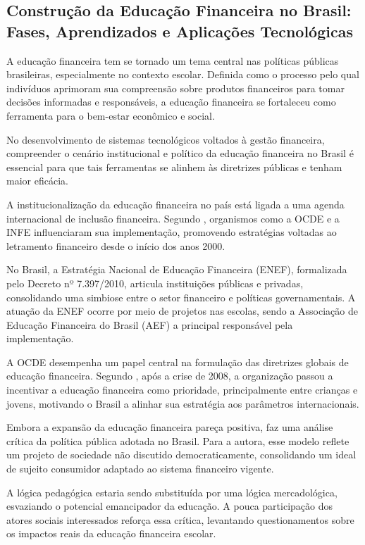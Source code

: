 \documentclass[
	article,			%
	12pt,				%
	oneside,			%
	a4paper,			%
	english,			%
	brazil,				%
	sumario=tradicional
	]{abntex2}
\begin{document}
\subsection{Construção da Educação Financeira no Brasil: Fases, Aprendizados e Aplicações Tecnológicas}
    A educação financeira tem se tornado um tema central nas políticas públicas brasileiras, especialmente no contexto escolar. Definida como o processo pelo qual indivíduos aprimoram sua compreensão sobre produtos financeiros para tomar decisões informadas e responsáveis, a educação financeira se fortaleceu como ferramenta para o bem-estar econômico e social.

    No desenvolvimento de sistemas tecnológicos voltados à gestão financeira, compreender o cenário institucional e político da educação financeira no Brasil é essencial para que tais ferramentas se alinhem às diretrizes públicas e tenham maior eficácia.

    A institucionalização da educação financeira no país está ligada a uma agenda internacional de inclusão financeira. Segundo , organismos como a OCDE e a INFE influenciaram sua implementação, promovendo estratégias voltadas ao letramento financeiro desde o início dos anos 2000.

    No Brasil, a Estratégia Nacional de Educação Financeira (ENEF), formalizada pelo Decreto nº 7.397/2010, articula instituições públicas e privadas, consolidando uma simbiose entre o setor financeiro e políticas governamentais. A atuação da ENEF ocorre por meio de projetos nas escolas, sendo a Associação de Educação Financeira do Brasil (AEF) a principal responsável pela implementação.

    A OCDE desempenha um papel central na formulação das diretrizes globais de educação financeira. Segundo , após a crise de 2008, a organização passou a incentivar a educação financeira como prioridade, principalmente entre crianças e jovens, motivando o Brasil a alinhar sua estratégia aos parâmetros internacionais.

    Embora a expansão da educação financeira pareça positiva,  faz uma análise crítica da política pública adotada no Brasil. Para a autora, esse modelo reflete um projeto de sociedade não discutido democraticamente, consolidando um ideal de sujeito consumidor adaptado ao sistema financeiro vigente.

    A lógica pedagógica estaria sendo substituída por uma lógica mercadológica, esvaziando o potencial emancipador da educação. A pouca participação dos atores sociais interessados reforça essa crítica, levantando questionamentos sobre os impactos reais da educação financeira escolar.
\end{document}
